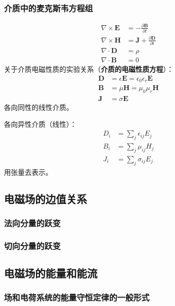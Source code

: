 \documentclass[12pt,a4paper]{ctexart}
\numberwithin{equation}{subsection}
\begin{document}
\subsubsection{介质中的麦克斯韦方程组}
\begin{equation}
\begin{aligned}
\nabla\times\mathbf{E}&=-\frac{\partial\mathbf{B}}{\partial t}\\
\nabla\times\mathbf{H}&=\mathbf{J}+\frac{\partial\mathbf{D}}{\partial t}\\
\nabla\cdot\mathbf{D}&=\rho\\
\nabla\cdot\mathbf{B}&=0
\end{aligned}
\end{equation}
关于介质电磁性质的实验关系（\textbf{介质的电磁性质方程}）：
\begin{align}
\mathbf{D}&=\epsilon\mathbf{E}=\epsilon_0\epsilon_r\mathbf{E}\\
\mathbf{B}&=\mu\mathbf{H}=\mu_0\mu_r\mathbf{H}\\
\mathbf{J}&=\sigma\mathbf{E}
\end{align}
各向同性的线性介质。

各向异性介质（线性）：
\begin{equation}
\begin{aligned}
D_i&=\sum_j \epsilon_{ij}E_j\\
B_i&=\sum_j \mu_{ij}H_j\\
J_i&=\sum_j \sigma_{ij}E_j
\end{aligned}
\end{equation}
用张量去表示。

\subsection{电磁场的边值关系}
\subsubsection{法向分量的跃变}

\subsubsection{切向分量的跃变}

\subsection{电磁场的能量和能流}
\subsubsection{场和电荷系统的能量守恒定律的一般形式}
\end{document}
